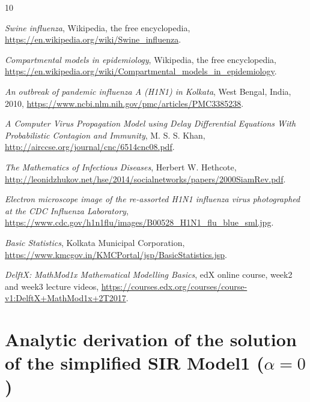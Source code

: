 \documentclass[11pt, a4paper, twoside]{report}
\begin{document}
\begin{thebibliography}{10}  %

 \textit{Swine influenza}, 
Wikipedia, 
the free encyclopedia, 
\url{https://en.wikipedia.org/wiki/Swine_influenza}. 

 \textit{Compartmental models in epidemiology},
Wikipedia, 
the free encyclopedia, 
\url{https://en.wikipedia.org/wiki/Compartmental_models_in_epidemiology}.

 \textit{An outbreak of pandemic influenza A (H1N1) in Kolkata}, 
West Bengal, 
India, 
2010,
\url{https://www.ncbi.nlm.nih.gov/pmc/articles/PMC3385238}.

 \textit{A Computer Virus Propagation
Model using Delay Differential Equations With Probabilistic Contagion and Immunity},
M. S. S. Khan,
\url{http://airccse.org/journal/cnc/6514cnc08.pdf}.

 \textit{The Mathematics of Infectious Diseases},
Herbert W. Hethcote,
\url{http://leonidzhukov.net/hse/2014/socialnetworks/papers/2000SiamRev.pdf}.

 \textit{Electron microscope image of the re-assorted H1N1 influenza virus photographed at the CDC Influenza Laboratory},
\url{https://www.cdc.gov/h1n1flu/images/B00528_H1N1_flu_blue_sml.jpg}.

 \textit{Basic Statistics}, 
Kolkata Municipal Corporation,
\url{https://www.kmcgov.in/KMCPortal/jsp/BasicStatistics.jsp}.

 \textit{DelftX: MathMod1x Mathematical Modelling Basics},
edX online course,
week2 and week3 lecture videos, 
\url{https://courses.edx.org/courses/course-v1:DelftX+MathMod1x+2T2017}.

\end{thebibliography}  

\appendix     
\chapter{Analytic derivation of the solution of the simplified SIR Model1 ($\alpha=0$)} 
\end{document}
